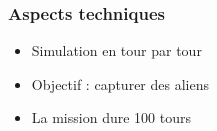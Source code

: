 \documentclass{beamer}
\begin{document}

\begin{frame}
    \frametitle{Aspects techniques}
    \begin{itemize}
        \item Simulation en tour par tour
        \item Objectif : capturer des aliens
        \item La mission dure 100 tours
    \end{itemize}
\end{frame}
\end{document}
